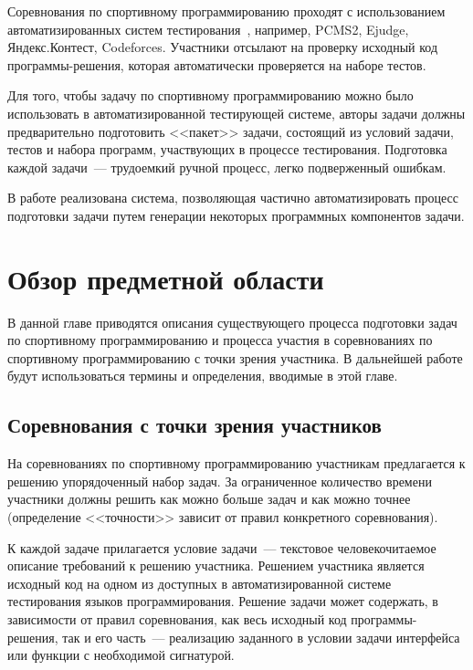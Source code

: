 \documentclass[times,specification,annotation]{style/itmo-student-thesis/itmo-student-thesis}
\begin{document}
\tableofcontents

\startprefacepage

Соревнования по спортивному программированию проходят с использованием автоматизированных систем тестирования~\cite{korneev-elizarov-pcms}, например, PCMS2, Ejudge, Яндекс.Контест, Codeforces. Участники отсылают на проверку исходный код программы-решения, которая автоматически проверяется на наборе тестов. 

Для того, чтобы задачу по спортивному программированию можно было использовать в автоматизированной тестирующей системе, авторы задачи должны предварительно подготовить <<пакет>> задачи, состоящий из условий задачи, тестов и набора программ, участвующих в процессе тестирования. Подготовка каждой задачи~--- трудоемкий ручной процесс, легко подверженный ошибкам.

В работе реализована система, позволяющая частично автоматизировать процесс подготовки задачи путем генерации некоторых программных компонентов задачи.


\chapter{Обзор предметной области}


В данной главе приводятся описания существующего процесса подготовки задач по спортивному программированию и процесса участия в соревнованиях по спортивному программированию с точки зрения участника. В дальнейшей работе будут использоваться термины и определения, вводимые в этой главе.

\section{Соревнования с точки зрения участников}

На соревнованиях по спортивному программированию участникам предлагается к решению упорядоченный набор задач. За ограниченное количество времени участники должны решить как можно больше задач и как можно точнее (определение <<точности>> зависит от правил конкретного соревнования).

К каждой задаче прилагается условие задачи~--- текстовое человекочитаемое описание требований к решению участника. Решением участника является исходный код на одном из доступных в автоматизированной системе тестирования языков программирования. Решение задачи может содержать, в зависимости от правил соревнования, как весь исходный код программы-решения, так и его часть~--- реализацию заданного в условии задачи интерфейса или функции с необходимой сигнатурой.
\end{document}
